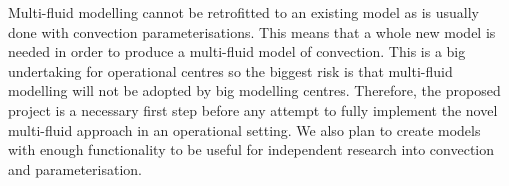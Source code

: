 \documentclass[11pt,a4paper]{article}
\begin{document}
Multi-fluid modelling cannot be retrofitted to an existing model as is usually done with convection parameterisations. This means that a whole new model is needed in order to produce a multi-fluid model of convection. This is a big undertaking for operational centres so the biggest risk is that multi-fluid modelling will not be adopted by big modelling centres.  Therefore, the proposed project is a necessary first step before any attempt to fully implement the novel multi-fluid approach in an operational setting. We also plan to create models with enough functionality to be useful for independent research into convection and parameterisation.

\renewcommand\refname{References (not included in Track Record)}

%

\end{document}
